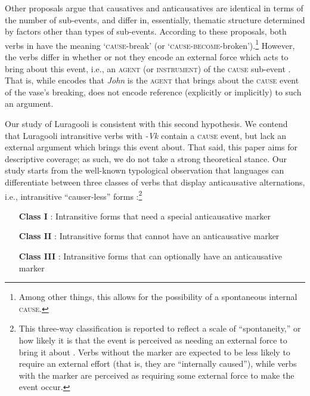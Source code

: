 \documentclass[output=paper]{langsci/langscibook}
\begin{document}
Other proposals argue that causatives and anticausatives are identical in terms of the number of sub-events, and differ in, essentially, thematic structure determined by factors other than types of sub-events. According to these proposals, both verbs in  have the meaning ‘\textsc{cause}-break’ (or ‘\textsc{cause-become}-broken’).\footnote{ Among other things, this allows for the possibility of a spontaneous internal \textsc{cause.}} However, the verbs differ in whether or not they encode an external force which acts to bring about this event, i.e., an \textsc{agent (}or \textsc{instrument}) of the \textsc{cause} sub-event \citep{LevinRappaportHovav1995,Schäfer2008}. That is, while  encodes that \textit{John }is the\textsc{ agent} that brings about the \textsc{cause} event of the vase’s breaking,  does not encode reference (explicitly or implicitly) to such an argument. 

  Our study of Luragooli is consistent with this second hypothesis. We contend that Luragooli intransitive verbs with \textit{-Vk} contain a \textsc{cause} event, but lack an external argument which brings this event about. That said, this paper aims for descriptive coverage; as such, we do not take a strong theoretical stance. Our study starts from the well-known typological observation that languages can differentiate between three classes of verbs that display anticausative alternations, i.e., intransitive “causer-less” forms \citep{Haspelmath1993,Schäfer2008}:\footnote{ This three-way classification is reported to reflect a scale of “spontaneity,” or how likely it is that the event is perceived as needing an external force to bring it about \citep{Haspelmath1993}. Verbs without the marker are expected to be less likely to require an external effort (that is, they are “internally caused”), while verbs with the marker are perceived as requiring some external force to make the event occur. }
\begin{itemize}
     \item[\textbf{  Class I}]: Intransitive forms that need a special anticausative marker\
     \item[\textbf{  Class II}]: Intransitive forms that cannot have an anticausative marker\\
     \item[\textbf{  Class III}]: Intransitive forms that can optionally have an anticausative marker\\ 
\end{itemize}
\end{document}
